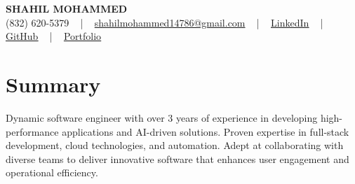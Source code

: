 \documentclass[letterpaper,10pt]{article}
\begin{document}
\begin{center}
    {\fontsize{14pt}{12pt}\selectfont \textbf{\MakeUppercase{Shahil Mohammed}}}\\ \vspace{2pt}
    \fontsize{10pt}{12pt}\selectfont (832) 620-5379 ~ | ~ \href{mailto:shahilmohammed14786@gmail.com}{shahilmohammed14786@gmail.com} ~ | ~  
    \href{https://www.linkedin.com/in/shahil-mohammed-9652931a1/}{\color{blue}\underline{LinkedIn}}  ~ | ~ 
    \href{https://github.com/freakbeast14}{\color{blue}\underline{GitHub}} ~ | ~ 
    \href{https://shahil-mohammed.netlify.app/}{\color{blue}\underline{Portfolio}}
    \vspace{-8pt}
\end{center}

\section{Summary}
\vspace{-2pt}\fontsize{8pt}{9pt}\selectfont
Dynamic software engineer with over 3 years of experience in developing high-performance applications and AI-driven solutions. Proven expertise in full-stack development, cloud technologies, and automation. Adept at collaborating with diverse teams to deliver innovative software that enhances user engagement and operational efficiency.

\vspace{-5pt}
 
\vspace{-2pt}
\end{document}
